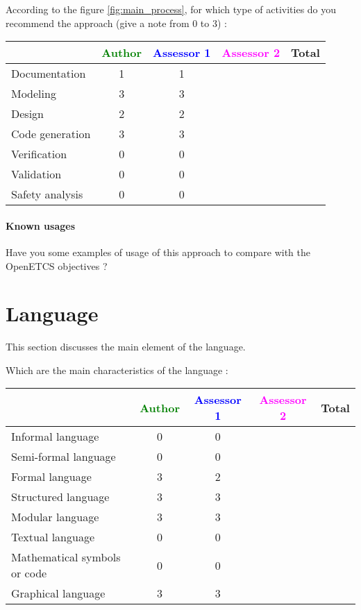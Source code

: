 According to the figure \ref{fig:main_process}, for which type of activities do you recommend the approach (give a note from 0 to  3) :

\begin{tabular}{|l | c | c | c | c|}
\hline
& \textcolor{green}{Author} & \textcolor{blue}{Assessor 1} & \textcolor{magenta}{Assessor 2} & Total \\
\hline 
Documentation &1 &1 & &  \\
\hline
Modeling &3 &3 & &  \\
\hline
Design &2 &2 & & \\
\hline
Code generation &3 &3 & & \\
\hline
Verification &0 &0 & & \\
\hline
Validation &0 &0 & & \\
\hline
Safety analysis &0 &0 & & \\
\hline
\end{tabular}

\paragraph{Known usages} Have you some examples of usage of this approach to  compare with the OpenETCS objectives ?

\section{Language}
This section discusses the main element of the language.

Which are the main characteristics of the language :

\begin{tabular}{|l | c | c | c | c|}
  \hline
  & \textcolor{green}{Author} & \textcolor{blue}{Assessor 1} & \textcolor{magenta}{Assessor 2} & Total \\
  \hline 
  Informal language &0 &0 & &  \\
  \hline 
  Semi-formal language &0 &0 & &  \\
  \hline
  Formal language &3 &2 & &  \\
  \hline
  Structured language &3 &3 & & \\
  \hline
  Modular language &3 &3 & & \\
  \hline
  Textual language &0 &0 & & \\
  \hline
  Mathematical symbols or code &0 &0 & & \\
  \hline
  Graphical language &3 &3 & & \\
  \hline
\end{tabular}

